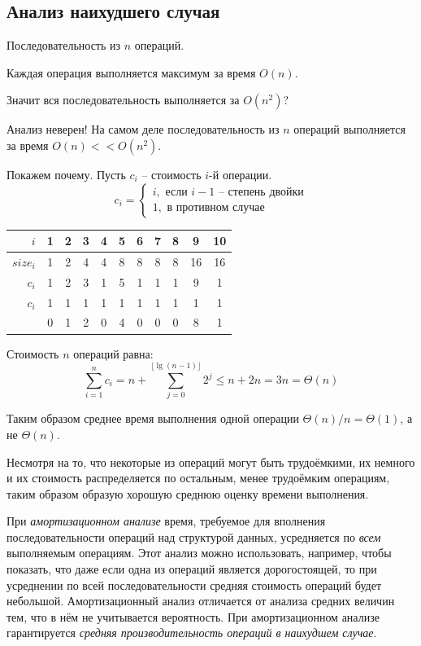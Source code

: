 \documentclass[a4paper,11pt]{article}
\begin{document}
\subsection{Анализ наихудшего случая}
Последовательность из $n$ операций.

Каждая операция выполняется максимум за время $O(n)$.

Значит вся последовательность выполняется за $O(n^2)$?

Анализ неверен! На самом деле последовательность из $n$ операций выполняется за
время $O(n) << O(n^2)$. 

Покажем почему. Пусть $c_i$ -- стоимость $i$-й операции.
$$
c_i = 
\begin{cases}
  i, \text{ если } i - 1 \text{ -- степень двойки}\\
  1, \text{ в противном случае}
\end{cases}
$$



\begin{tabular}{|r|c|c|c|c|c|c|c|c|c|c|}
  \hline
     $i$ & 1 & 2 & 3 & 4 & 5 & 6 & 7 & 8 & 9  & 10 \\
  \hline
$size_i$ & 1 & 2 & 4 & 4 & 8 & 8 & 8 & 8 & 16 & 16 \\
  \hline
   $c_i$ & 1 & 2 & 3 & 1 & 5 & 1 & 1 & 1 & 9  & 1 \\
  \hline
   $c_i$ & 1 & 1 & 1 & 1 & 1 & 1 & 1 & 1 & 1 & 1 \\
         & 0 & 1 & 2 & 0 & 4 & 0 & 0 & 0 & 8 & 1 \\
  \hline
\end{tabular}

Стоимость $n$ операций равна:
$$
\sum_{i=1}^n c_i = n + \sum_{j=0}^{\lfloor \lg(n - 1) \rfloor} 2^j \leqslant n +
2n = 3n = \Theta(n)
$$

Таким образом среднее время выполнения одной операции $\Theta(n) / n =
\Theta(1)$, а не $\Theta(n)$.

Несмотря на то, что некоторые из операций могут быть трудоёмкими, их немного и
их стоимость распределяется по остальным, менее трудоёмким операциям, таким
образом образую хорошую среднюю оценку времени выполнения.

При \emph{амортизационном анализе} время, требуемое для вполнения
последовательности операций над структурой данных, усредняется по \emph{всем}
выполняемым операциям. Этот анализ можно использовать, например, чтобы показать,
что даже если одна из операций является дорогостоящей, то при усреднении по всей
последовательности средняя стоимость операций будет небольшой. Амортизационный
анализ отличается от анализа средних величин тем, что в нём не учитывается
вероятность. При амортизационном анализе гарантируется \emph{средняя
производительность операций в наихудшем случае}.
\end{document}
